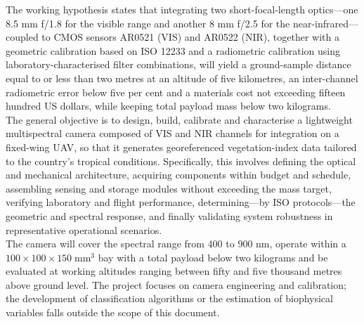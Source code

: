 \noindent The working hypothesis states that integrating two short-focal-length
optics—one 8.5 mm f/1.8 for the visible range and another 8 mm f/2.5 for
the near-infrared—coupled to CMOS sensors AR0521 (VIS) and AR0522 (NIR),
together with a geometric calibration based on ISO 12233 and a
radiometric calibration using laboratory-characterised filter
combinations, will yield a ground-sample distance equal to or less than
two metres at an altitude of five kilometres, an inter-channel
radiometric error below five per cent and a materials cost not exceeding
fifteen hundred US dollars, while keeping total payload mass below two
kilograms.\\

\noindent The general objective is to design, build, calibrate and
characterise a lightweight multispectral camera composed of VIS and NIR
channels for integration on a fixed-wing UAV, so that it generates
georeferenced vegetation-index data tailored to the country’s tropical
conditions.  Specifically, this involves defining the optical and
mechanical architecture, acquiring components within budget and
schedule, assembling sensing and storage modules without exceeding the
mass target, verifying laboratory and flight performance, determining—by
ISO protocols—the geometric and spectral response, and finally
validating system robustness in representative operational scenarios.\\

\noindent The camera will cover the spectral range from 400 to 900 nm, operate
within a \(100\times100\times150\;\text{mm}^3\) bay with a total payload
below two kilograms and be evaluated at working altitudes ranging
between fifty and five thousand metres above ground level.  The project
focuses on camera engineering and calibration; the development of
classification algorithms or the estimation of biophysical variables
falls outside the scope of this document.\\

